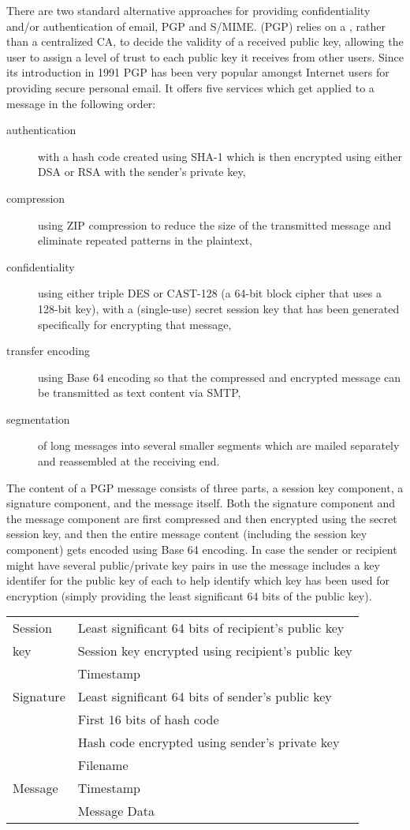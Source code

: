 There are two standard alternative approaches for providing confidentiality and/or
authentication of email, PGP and S/MIME.
 (PGP) relies on a ,
rather than a centralized CA, to decide the validity of a received public key,
allowing the user to assign a level of trust to each public key it receives from other users.
Since its introduction in 1991 PGP has been very popular amongst Internet users
for providing secure personal email.
It offers five services which get applied to a message in the following order:
\begin{description}
  \item[authentication] with a hash code created using SHA-1 which is then
  encrypted using either DSA or RSA with the sender's private key,
  \item[compression] using ZIP compression to reduce the size of the transmitted message
  and eliminate repeated patterns in the plaintext,
  \item[confidentiality] using either triple DES or CAST-128 (a 64-bit block cipher
  that uses a 128-bit key), with a (single-use) secret session key that has been generated
  specifically for encrypting that message,
  \item[transfer encoding] using Base 64 encoding so that the compressed and encrypted
  message can be transmitted as text content via SMTP,
  \item[segmentation] of long messages into several smaller segments which are
  mailed separately and reassembled at the receiving end.
\end{description}
The content of a PGP message consists of three parts, a session key component, a signature
component, and the message itself.
Both the signature component and the message component are first compressed and then
encrypted using the secret session key, and then the entire message content
(including the session key component) gets encoded using Base 64 encoding.
In case the sender or recipient might have several public/private key pairs in use
the message includes a key identifer for the public key of each to help identify
which key has been used for encryption (simply providing the least significant
64 bits of the public key).
\begin{center}
\begin{tabular}{|l|l|} \hline
  Session   & Least significant 64 bits of recipient's public key \\
  key       & Session key encrypted using recipient's public key \\ \hline
            & Timestamp \\
  Signature & Least significant 64 bits of sender's public key \\
            & First 16 bits of hash code \\
            & Hash code encrypted using sender's private key \\ \hline
            & Filename \\
  Message   & Timestamp \\
            & Message Data \\ \hline
\end{tabular}
\end{center}
